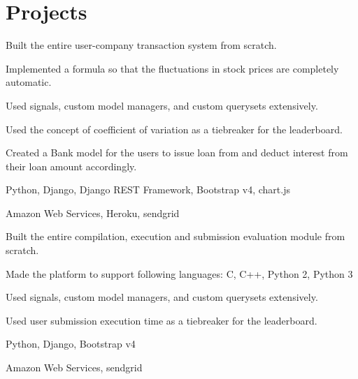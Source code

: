 
\section{Projects}

\begin{tightemize}
\item Built the entire user-company transaction system from scratch.
\item Implemented a formula so that the fluctuations in stock prices are completely automatic.
\item Used signals, custom model managers, and custom querysets extensively.
\item Used the concept of coefficient of variation as a tiebreaker for the leaderboard.
\item Created a Bank model for the users to issue loan from and deduct interest from their loan amount accordingly.
\item {} Python, Django, Django REST Framework, Bootstrap v4, chart.js
\item {} Amazon Web Services, Heroku, sendgrid
\end{tightemize}
\sectionsep

\begin{tightemize}
\item Built the entire compilation, execution and submission evaluation module from scratch.
\item Made the platform to support following languages: C, C++, Python 2, Python 3
\item Used signals, custom model managers, and custom querysets extensively.
\item Used user submission execution time as a tiebreaker for the leaderboard.
\item {} Python, Django, Bootstrap v4
\item {} Amazon Web Services, sendgrid
\end{tightemize}
\sectionsep